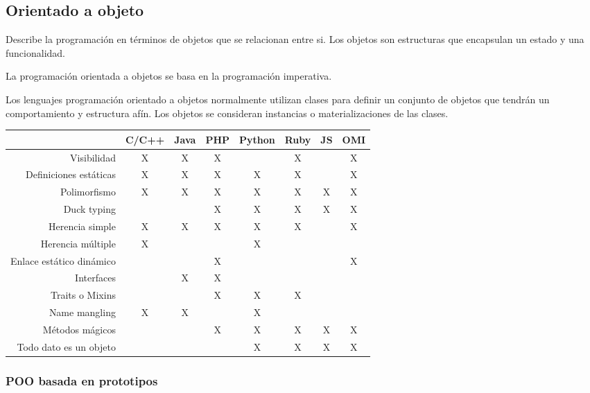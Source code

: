 \subsection{Orientado a objeto}
Describe la programación en términos de objetos que se relacionan entre si. Los objetos son 
estructuras que encapsulan un estado y una funcionalidad. 

La programación orientada a objetos se basa en la programación imperativa.

Los lenguajes programación orientado a objetos normalmente utilizan clases 
para definir un conjunto de objetos que tendrán un comportamiento y estructura afín. 
Los objetos se consideran instancias o materializaciones de las clases.


\FloatBarrier
\begin{table}[h]
\begin{center}
 
\begin{tabular}{|r|c|c|c|c|c|c|c|} \hline
 & C/C++ & Java & PHP  & Python & Ruby & JS & OMI\\ \hline
Visibilidad & X & X & X &  & X &  & X \\ \hline
Definiciones estáticas & X & X & X & X & X &  & X \\ \hline
Polimorfismo & X & X & X & X & X & X & X \\ \hline
Duck typing & & & X & X & X & X & X \\ \hline
Herencia simple  & X & X & X & X & X &  & X \\ \hline
Herencia múltiple  & X & &  & X &  &  &  \\ \hline
Enlace estático dinámico & & & X &  &  &  &  X \\ \hline
Interfaces & & X & X &  &  &  &   \\ \hline
Traits o Mixins & & & X & X & X &  &   \\ \hline
Name mangling & X & X & & X & & &  \\ \hline
Métodos mágicos & & & X & X & X & X & X \\ \hline 
Todo dato es un objeto & & &  & X & X & X & X \\ \hline 
\end{tabular}
\end{center}
\end{table}
\FloatBarrier

\subsubsection{POO basada en prototipos}

